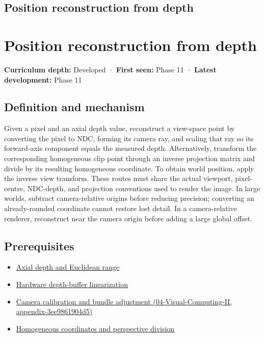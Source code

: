 \hypertarget{appendix-2cbf2968e866}{}
\section*{Position reconstruction from depth}
\chapter{Position reconstruction from depth}\label{appendix-2cbf2968e866-position-reconstruction-from-depth}

\textbf{Curriculum depth:} Developed · \textbf{First seen:} Phase 11 · \textbf{Latest development:} Phase 11

\section{Definition and mechanism}\label{appendix-2cbf2968e866-definition-and-mechanism}

Given a pixel and an axial depth value, reconstruct a view-space point by converting the pixel to NDC, forming its camera ray, and scaling that ray so its forward-axis component equals the measured depth. Alternatively, transform the corresponding homogeneous clip point through an inverse projection matrix and divide by its resulting homogeneous coordinate. To obtain world position, apply the inverse view transform. These routes must share the actual viewport, pixel-centre, NDC-depth, and projection conventions used to render the image. In large worlds, subtract camera-relative origins before reducing precision; converting an already-rounded coordinate cannot restore lost detail. In a camera-relative renderer, reconstruct near the camera origin before adding a large global offset.

\section{Prerequisites}\label{appendix-2cbf2968e866-prerequisites}

\begin{itemize}
\tightlist
\item
  \hyperref[appendix-cac01ebeeb11]{Axial depth and Euclidean range}
\item
  \hyperref[appendix-1bc40b08db4a]{Hardware depth-buffer linearization}
\item
  \href{../04-Visual-Computing-II/main.pdf\#nameddest=appendix-3ee9861904d5}{Camera calibration and bundle adjustment (04-Visual-Computing-II, appendix-3ee9861904d5)}
\item
  \hyperref[appendix-cb3b26862282]{Homogeneous coordinates and perspective division}
\end{itemize}

